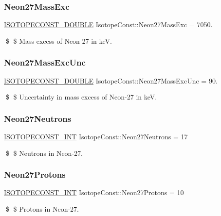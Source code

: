 \subsubsection{\texorpdfstring{Neon27\+Mass\+Exc}{Neon27MassExc}}
{\footnotesize\ttfamily \mbox{\hyperlink{group___isotope_const-_macros_ga8f45a7272ce02c0b4c65c44636ed719a}{I\+S\+O\+T\+O\+P\+E\+C\+O\+N\+S\+T\+\_\+\+D\+O\+U\+B\+LE}} Isotope\+Const\+::\+Neon27\+Mass\+Exc = 7050.}

\$ \$ Mass excess of Neon-\/27 in keV. \mbox{\label{group___isotope_const-_neon-_ne27_ga63f9f4861da85b828b63f54ee9334a34}} 
\subsubsection{\texorpdfstring{Neon27\+Mass\+Exc\+Unc}{Neon27MassExcUnc}}
{\footnotesize\ttfamily \mbox{\hyperlink{group___isotope_const-_macros_ga8f45a7272ce02c0b4c65c44636ed719a}{I\+S\+O\+T\+O\+P\+E\+C\+O\+N\+S\+T\+\_\+\+D\+O\+U\+B\+LE}} Isotope\+Const\+::\+Neon27\+Mass\+Exc\+Unc = 90.}

\$ \$ Uncertainty in mass excess of Neon-\/27 in keV. \mbox{\label{group___isotope_const-_neon-_ne27_ga76f3e720a2988a2da39507581df8b511}} 
\subsubsection{\texorpdfstring{Neon27\+Neutrons}{Neon27Neutrons}}
{\footnotesize\ttfamily \mbox{\hyperlink{group___isotope_const-_macros_ga5f18360b3e99483a35c32d789e62621c}{I\+S\+O\+T\+O\+P\+E\+C\+O\+N\+S\+T\+\_\+\+I\+NT}} Isotope\+Const\+::\+Neon27\+Neutrons = 17}

\$ \$ Neutrons in Neon-\/27. \mbox{\label{group___isotope_const-_neon-_ne27_ga9da47b25eabb1b55bf98ecb7d50e4226}} 
\subsubsection{\texorpdfstring{Neon27\+Protons}{Neon27Protons}}
{\footnotesize\ttfamily \mbox{\hyperlink{group___isotope_const-_macros_ga5f18360b3e99483a35c32d789e62621c}{I\+S\+O\+T\+O\+P\+E\+C\+O\+N\+S\+T\+\_\+\+I\+NT}} Isotope\+Const\+::\+Neon27\+Protons = 10}

\$ \$ Protons in Neon-\/27. 